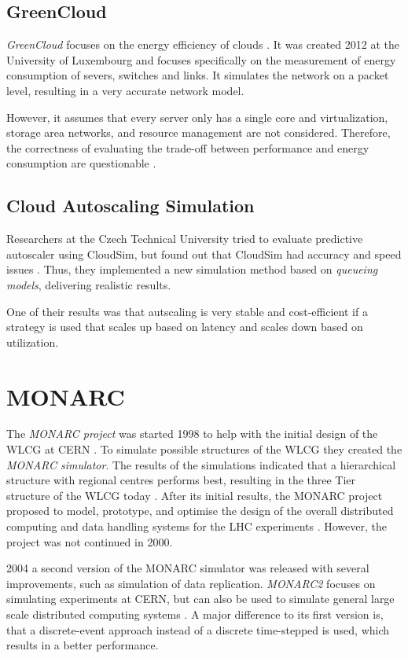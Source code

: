 \subsection{GreenCloud}
\textit{GreenCloud} focuses on the energy efficiency of clouds \cite{green_cloud}. It was created 2012 
at the University of Luxembourg and focuses specifically on the measurement of energy consumption of severs, switches and links. It simulates the network on a packet level, resulting in a very accurate network model.  

However, it assumes that every server only has a single core and virtualization, storage area networks, and resource management are not considered. Therefore, the correctness of evaluating the trade-off between performance and energy consumption are questionable \cite{survey_clouds}.

\subsection{Cloud Autoscaling Simulation}
Researchers at the Czech Technical University tried to evaluate predictive autoscaler using CloudSim, but found out that CloudSim had accuracy and speed issues \cite{autoscale_cloud}. Thus, they implemented a new simulation method based on \textit{queueing models}, delivering realistic results. 

One of their results was that autscaling is very stable and cost-efficient if a strategy is used that scales up based on latency and scales down based on utilization. 

\section{MONARC}
The \textit{MONARC project} was started 1998 to help with the initial design of the WLCG at CERN \cite{monarc2000models}.
To simulate possible structures of the WLCG they created the \textit{MONARC simulator}.
The results of the simulations indicated that a hierarchical structure with regional centres performs best, resulting in the three Tier structure of the WLCG today \cite{morita2001validation}. 
After its initial results, the MONARC project proposed to model, prototype, and optimise the design of the overall distributed computing and data handling systems for the LHC experiments \cite{monarc2000models}.
However, the project was not continued in 2000.

2004 a second version of the MONARC simulator was released with several improvements, such as simulation of data replication. \textit{MONARC2} focuses on simulating experiments at CERN, but can also be used to simulate general large scale distributed computing systems \cite{legrand2003monarc}. A major difference to its first version is, that a discrete-event approach instead of a discrete time-stepped is used, which results in a better performance.

